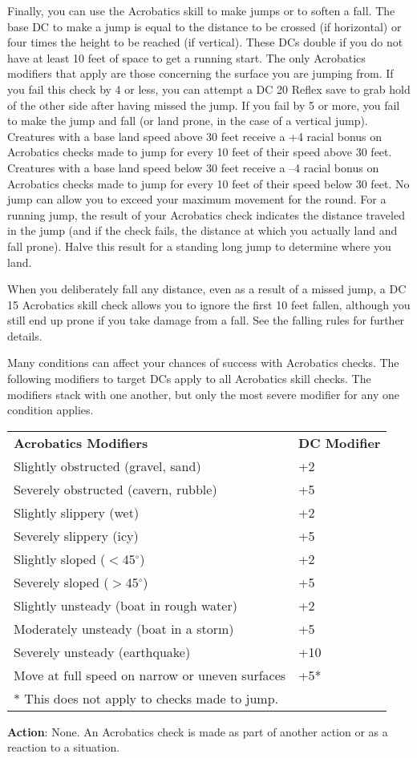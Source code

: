 Finally, you can use the Acrobatics skill to make jumps or to soften a fall. The base DC to make a jump is equal to the distance to be crossed (if horizontal) or four times the height to be reached (if vertical). These DCs double if you do not have at least 10 feet of space to get a running start. The only Acrobatics modifiers that apply are those concerning the surface you are jumping from. If you fail this check by 4 or less, you can attempt a DC 20 Reflex save to grab hold of the other side after having missed the jump. If you fail by 5 or more, you fail to make the jump and fall (or land prone, in the case of a vertical jump). Creatures with a base land speed above 30 feet receive a +4 racial bonus on Acrobatics checks made to jump for every 10 feet of their speed above 30 feet. Creatures with a base land speed below 30 feet receive a --4 racial bonus on Acrobatics checks made to jump for every 10 feet of their speed below 30 feet. No jump can allow you to exceed your maximum movement for the round. For a running jump, the result of your Acrobatics check indicates the distance traveled in the jump (and if the check fails, the distance at which you actually land and fall prone). Halve this result for a standing long jump to determine where you land.
				
When you deliberately fall any distance, even as a result of a missed jump, a DC 15 Acrobatics skill check allows you to ignore the first 10 feet fallen, although you still end up prone if you take damage from a fall. See the falling rules for further details.
				
Many conditions can affect your chances of success with Acrobatics checks. The following modifiers to target DCs apply to all Acrobatics skill checks. The modifiers stack with one another, but only the most severe modifier for any one condition applies.

\begin{table}
\sffamily
 \begin{tabular}{ll}
\textbf{Acrobatics Modifiers} & \textbf{DC Modifier}\\
Slightly obstructed (gravel, sand) & +2\\
Severely obstructed (cavern, rubble) & +5\\
Slightly slippery (wet) & +2\\
Severely slippery (icy) & +5\\
Slightly sloped (\mbox{$<$}45\mbox{${}^\circ$})& +2 \\
Severely sloped (\mbox{$>$}45\mbox{${}^\circ$}) & +5\\
Slightly unsteady (boat in rough water) & +2\\
Moderately unsteady (boat in a storm) & +5\\
Severely unsteady (earthquake) & +10\\
Move at full speed on narrow or uneven surfaces & +5*\\  
* This does not apply to checks made to jump.
 \end{tabular}
\end{table}		
\textbf{Action}: None. An Acrobatics check is made as part of another action or as a reaction to a situation.
				
